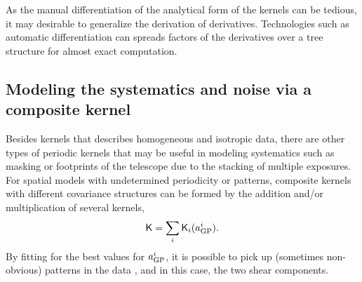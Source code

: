 As the manual differentiation of the analytical form of the kernels can be tedious,
it may desirable to generalize the derivation of derivatives. Technologies such
as automatic differentiation 
can spreads factors of the derivatives over a tree structure for
almost exact computation.
 




% 
% 

\subsection{Modeling the systematics and noise via a composite kernel}
Besides kernels that describes homogeneous and isotropic data,
there are other types of periodic kernels that may be useful
in modeling systematics such as masking or footprints of the telescope due to the
stacking of multiple exposures.
For spatial models with undetermined periodicity or patterns, 
composite kernels with different covariance structures 
can be formed by the addition and/or multiplication of several kernels,
\begin{equation}
	\mathsf{K} = \sum_i \mathsf{K}_i(a_{\rm GP}^i).
\end{equation}
By fitting for the best values for $a_{\rm GP}^i$, it is possible  
to pick up (sometimes non-obvious) patterns in the data \citep{Duvenaud2013},
and in this case, the two shear components. 


